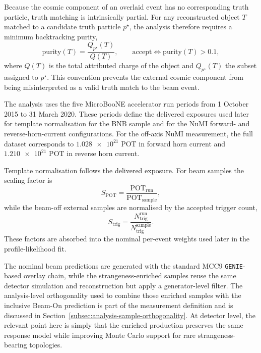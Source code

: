 Because the cosmic component of an overlaid event has no corresponding truth
particle, truth matching is intrinsically partial. For any reconstructed object
\(T\) matched to a candidate truth particle \(p^\star\), the analysis therefore
requires a minimum backtracking purity,
\begin{equation}
  \mathrm{purity}(T)
  =
  \frac{Q_{p^\star}(T)}{Q(T)},
  \qquad
  \mathrm{accept}\iff \mathrm{purity}(T)>0.1,
  \label{eq:ch3-overlay-purity}
\end{equation}
where \(Q(T)\) is the total attributed charge of the object and \(Q_{p^\star}(T)\)
the subset assigned to \(p^\star\). This convention prevents the external cosmic
component from being misinterpreted as a valid truth match to the beam event.

The analysis uses the five MicroBooNE accelerator run periods from
1 October 2015 to 31 March 2020. These periods define the delivered exposures
used later for template normalisation for the BNB sample and for the NuMI
forward- and reverse-horn-current configurations. For the off-axis NuMI
measurement, the full dataset corresponds to \(\num{1.028e21}\) POT in forward
horn current and \(\num{1.210e21}\) POT in reverse horn current.

Template normalisation follows the delivered exposure. For beam samples the
scaling factor is
\begin{equation}
  S_{\mathrm{POT}}
  =
  \frac{\mathrm{POT}_{\mathrm{run}}}{\mathrm{POT}_{\mathrm{sample}}},
  \label{eq:ch3-pot-scale}
\end{equation}
while the beam-off external samples are normalised by the accepted trigger
count,
\begin{equation}
  S_{\mathrm{trig}}
  =
  \frac{N_{\mathrm{trig}}^{\mathrm{run}}}
       {N_{\mathrm{trig}}^{\mathrm{sample}}}.
  \label{eq:ch3-trigger-scale}
\end{equation}
These factors are absorbed into the nominal per-event weights used later in the
profile-likelihood fit.

The nominal beam predictions are generated with the standard MCC9
\texttt{GENIE}-based overlay chain, while the strangeness-enriched samples reuse
the same detector simulation and reconstruction but apply a generator-level
filter. The analysis-level orthogonality used to combine those enriched samples
with the inclusive Beam-On prediction is part of the measurement definition and
is discussed in Section~\ref{subsec:analysis-sample-orthogonality}. At detector
level, the relevant point here is simply that the enriched production preserves
the same response model while improving Monte Carlo support for rare
strangeness-bearing topologies.


